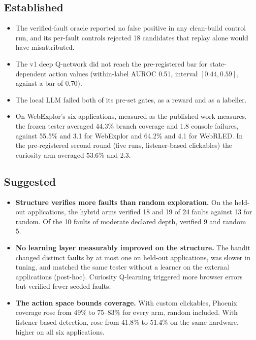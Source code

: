 \subsection*{Established}
\begin{itemize}[noitemsep]
  \item The verified-fault oracle reported no false positive in any clean-build control
        run, and its per-fault controls rejected 18 candidates that replay alone would have
        misattributed.
  \item The v1 deep Q-network did not reach the pre-registered bar for state-dependent
        action values (within-label AUROC 0.51, interval $[0.44, 0.59]$, against a bar of
        0.70).
  \item The local LLM failed both of its pre-set gates, as a reward and as a labeller.
  \item On WebExplor's six applications, measured as the published work measures, the frozen
        tester averaged 44.3\% branch coverage and 1.8 console failures, against 55.5\% and
        3.1 for WebExplor and 64.2\% and 4.1 for WebRLED. In the pre-registered second
        round (five runs, listener-based clickables) the curiosity arm averaged 53.6\% and
        2.3.
\end{itemize}

\subsection*{Suggested}
\begin{itemize}[noitemsep]
  \item \textbf{Structure verifies more faults than random exploration.} On the held-out
        applications, the hybrid arms verified 18 and 19 of 24 faults against 13 for random.
        Of the 10 faults of moderate declared depth,  verified 9 and
        random 5.
  \item \textbf{No learning layer measurably improved on the structure.} The bandit changed distinct
        faults by at most one on held-out applications, was slower in tuning, and matched
        the same tester without a learner on the external applications (post-hoc). Curiosity
        Q-learning triggered more browser errors but verified fewer seeded faults.
  \item \textbf{The action space bounds coverage.} With custom clickables, Phoenix coverage
        rose from 49\% to 75--83\% for every arm, random included. With listener-based
        detection,  rose from 41.8\% to 51.4\% on the same hardware,
        higher on all six applications.
\end{itemize}

